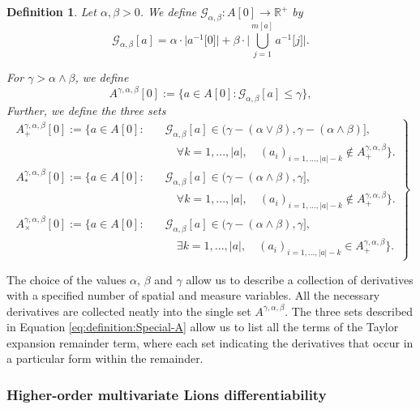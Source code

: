 \documentclass[a4paper,11pt,twoside]{article}
\numberwithin{equation}{section}
\theoremstyle{plain}
\newtheorem{definition}[theorem]{Definition}
\newcommand{\bR}{\mathbb{R}}
\newcommand{\scG}{\mathscr{G}}
\newcommand{\1}{\mathbbm{1}}
\begin{document}
	\begin{definition}
		\label{definition:Special-A}
		Let $\alpha, \beta>0$. We define $\scG_{\alpha, \beta}: A[0] \to \bR^{+}$ by
		$$
		\scG_{\alpha, \beta}[a] = \alpha \cdot \Big| a^{-1}\big[ 0 \big] \Big| + \beta \cdot \Big| \bigcup_{j=1}^{m[a]} a^{-1}\big[ j\big] \Big|. 
		$$
		
		For $\gamma>\alpha \wedge \beta$, we define
		$$
		A^{\gamma, \alpha, \beta}[0]:= \Big\{ a\in A[0]: \scG_{\alpha, \beta}[a] \leq \gamma \Big\}, 
		$$
		Further, we define the three sets
		\begin{equation}
			\label{eq:definition:Special-A}
			\left.
			\begin{aligned}
				A_{+}^{\gamma, \alpha, \beta}[0]:= \Big\{ a\in A[0]:\quad & \scG_{\alpha, \beta}[a] \in \big( \gamma-(\alpha\vee\beta), \gamma-(\alpha\wedge\beta) \big] , 
				\\
				&\quad \forall k= 1, ..., |a|, \quad (a_i)_{i=1, ..., |a|-k} \notin A_{+}^{\gamma, \alpha, \beta} \Big\}. 
				\\
				A_{\ast}^{\gamma, \alpha, \beta}[0]:= \Big\{ a\in A[0]:\quad & \scG_{\alpha, \beta}[a] \in \big( \gamma-(\alpha\wedge\beta), \gamma \big], 
				\\
				&\quad \forall k= 1, ..., |a|, \quad (a_i)_{i=1, ..., |a|-k} \notin A_{+}^{\gamma, \alpha, \beta} \Big\}. 
				\\
				A_{\times}^{\gamma, \alpha, \beta}[0]:= \Big\{ a\in A[0]: \quad & \scG_{\alpha, \beta}[a] \in \big( \gamma-(\alpha\wedge\beta), \gamma \big], 
				\\
				&\quad \exists k= 1, ..., |a|, \quad (a_i)_{i=1, ..., |a|-k} \in A_{+}^{\gamma, \alpha, \beta} \Big\}. 
			\end{aligned}
			\right\}
		\end{equation}
	\end{definition}
	
	The choice of the values $\alpha$, $\beta$ and $\gamma$ allow us to describe a collection of derivatives with a specified number of spatial and measure variables. All the necessary derivatives are collected neatly into the single set $A^{\gamma, \alpha, \beta}$. The three sets described in Equation \eqref{eq:definition:Special-A} allow us to list all the terms of the Taylor expansion remainder term, where each set indicating the derivatives that occur in a particular form within the remainder.  
	
	\subsubsection*{Higher-order multivariate Lions differentiability}
	
\end{document}

